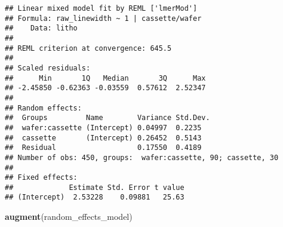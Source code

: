 \documentclass[]{book}
\newenvironment{Shaded}{\begin{snugshade}}{\end{snugshade}}
\newcommand{\KeywordTok}[1]{\textcolor[rgb]{0.13,0.29,0.53}{\textbf{#1}}}
\newcommand{\NormalTok}[1]{#1}
\theoremstyle{definition}
\theoremstyle{definition}
\theoremstyle{definition}
\theoremstyle{remark}
\begin{document}
\begin{verbatim}
## Linear mixed model fit by REML ['lmerMod']
## Formula: raw_linewidth ~ 1 | cassette/wafer
##    Data: litho
## 
## REML criterion at convergence: 645.5
## 
## Scaled residuals: 
##      Min       1Q   Median       3Q      Max 
## -2.45850 -0.62363 -0.03559  0.57612  2.52347 
## 
## Random effects:
##  Groups         Name        Variance Std.Dev.
##  wafer:cassette (Intercept) 0.04997  0.2235  
##  cassette       (Intercept) 0.26452  0.5143  
##  Residual                   0.17550  0.4189  
## Number of obs: 450, groups:  wafer:cassette, 90; cassette, 30
## 
## Fixed effects:
##             Estimate Std. Error t value
## (Intercept)  2.53228    0.09881   25.63
\end{verbatim}

\begin{Shaded}
\begin{Highlighting}[]
\KeywordTok{augment}\NormalTok{(random_effects_model)}
\end{Highlighting}
\end{Shaded}
\end{document}

